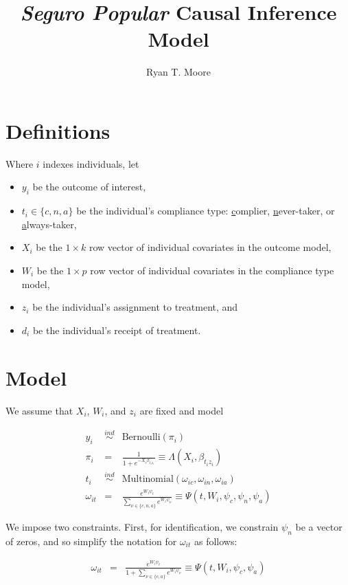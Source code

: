 \documentclass[12pt]{article}
\title{\emph{Seguro Popular} Causal Inference Model}
\author{Ryan T. Moore}
\begin{document}
\maketitle

\section{Definitions}

Where $i$ indexes individuals, let
\begin{itemize}
\item $y_i$ be the outcome of interest,
\item $t_i \in \{c,n,a \}$ be the individual's compliance
type: \underline{c}omplier, \underline{n}ever-taker, or
\underline{a}lways-taker, 
\item $X_i$ be the $1\times k$ row vector of individual covariates in the
outcome model, 
\item $W_i$ be the $1 \times p$ row vector of individual
covariates in the compliance type model,
\item $z_i$ be the individual's assignment to treatment, and
\item $d_i$ be the individual's receipt of treatment.
\end{itemize}

\section{Model}

We assume that $X_i$, $W_i$, and $z_i$ are fixed and model

\begin{eqnarray*}
  y_i & \stackrel{ind}{\sim} & \text{Bernoulli}(\pi_i) \\
  \pi_i & = & \frac{1}{1+e^{-X_i \beta_{t_iz_i}}} \equiv \Lambda(X_i, \beta_{t_i z_i})\\
  t_i & \stackrel{ind}{\sim}&\text{Multinomial}(\omega_{ic},\omega_{in},\omega_{ia}) \\
  \omega_{it} & = & \frac{e^{W_i \psi_t}}{\sum_{\nu \in \{c,n,a\}}
    e^{W_i \psi_{\nu}}} \equiv \Psi(t, W_i, \psi_c, \psi_n, \psi_a)
\end{eqnarray*}

We impose two constraints.  First, for identification, we
constrain $\psi_n$ be a vector of zeros, and so simplify the notation
for $\omega_{it}$ as follows:

\begin{eqnarray*}
\omega_{it} & = & \frac{e^{W_i \psi_t}}{1 + \sum_{\nu \in \{c,a\}}
e^{W_i \psi_{\nu}}} \equiv \Psi(t, W_i, \psi_c, \psi_a)
\end{eqnarray*}
\end{document}
